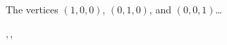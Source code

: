 \documentclass[a4,12pt]{article}
\begin{document}
\thispagestyle{empty}

\noindent The vertices $(1,0,0)$, $(0,1,0)$, and $(0,0,1)$\dots

\vspace{4cm}

\noindent\Huge $,$,

\vspace{4cm}

\familydefault
\end{document}
